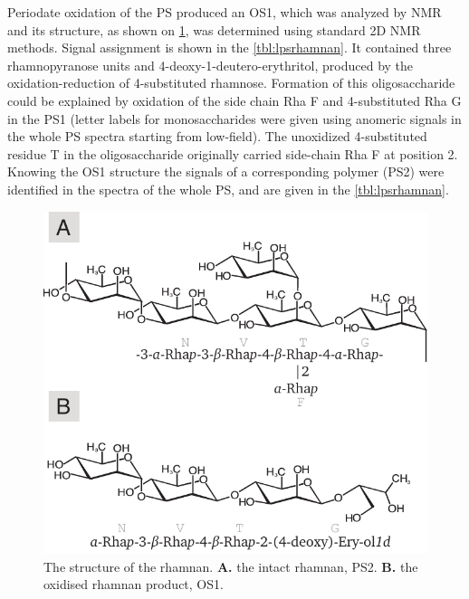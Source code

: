 Periodate oxidation of the \ac{PS} produced an \ac{OS}1, which was analyzed by \ac{NMR} and its
structure, as shown on \cref{fig:lpsrhamnan}, was determined using standard 2D \ac{NMR}
methods. Signal assignment is shown in the \cref{tbl:lpsrhamnan}. It contained three
rhamnopyranose units and 4-deoxy-1-deutero-erythritol, produced by the oxidation-reduction of
4-substituted rhamnose. Formation of this oligosaccharide could be explained by oxidation of the
side chain Rha F and 4-substituted Rha G in the \ac{PS}1 (letter labels for monosaccharides were
given using anomeric signals in the whole \ac{PS} spectra starting from low-field). The unoxidized
4-substituted residue T in the oligosaccharide originally carried side-chain Rha F at position
2. Knowing the \ac{OS}1 structure the signals of a corresponding polymer (\ac{PS}2) were
identified in the spectra of the whole \ac{PS}, and are given in the \cref{tbl:lpsrhamnan}.

\begin{figure}[htb]
  \begin{center}
    \includegraphics[]{lps_chapter/img/lpsrhamnan.pdf}
  \end{center}
  \caption[The structure of the \caulobacter rhamnan.]{The structure of the \caulobacter rhamnan. \textbf{A.} the intact rhamnan, \ac{PS}2. \textbf{B.} the oxidised rhamnan product, \ac{OS}1.}
  \label{fig:lpsrhamnan}
\end{figure}

